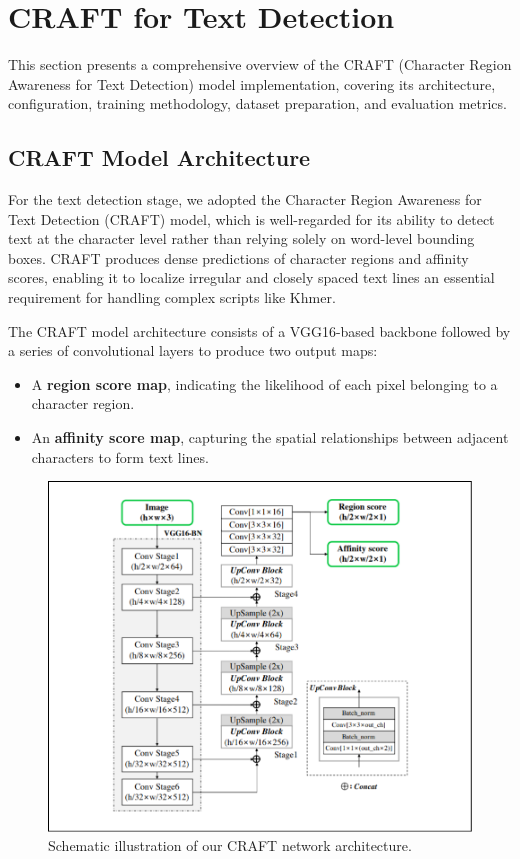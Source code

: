 \section{CRAFT for Text Detection}
\label{sec:craft-complete}

This section presents a comprehensive overview of the CRAFT (Character Region Awareness for Text Detection) model implementation, covering its architecture, configuration, training methodology, dataset preparation, and evaluation metrics.

\subsection{CRAFT Model Architecture}
\label{subsec:craft-architecture}

For the text detection stage, we adopted the Character Region Awareness for Text 
Detection (CRAFT) model, which is well-regarded for its ability to detect text at 
the character level rather than relying solely on word-level bounding boxes. 
CRAFT produces dense predictions of character regions and affinity scores, 
enabling it to localize irregular and closely spaced text lines an essential 
requirement for handling complex scripts like Khmer.

The CRAFT model architecture consists of a VGG16-based backbone followed by a series 
of convolutional layers to produce two output maps:
\begin{itemize}
\item A \textbf{region score map}, indicating the likelihood of each pixel belonging 
to a character region.
\item An \textbf{affinity score map}, capturing the spatial relationships between 
adjacent characters to form text lines.
\end{itemize}

\begin{figure}[H]
    \centering
    \includegraphics[width=\textwidth]{figures/craft_model.png}
    \caption{Schematic illustration of our CRAFT network architecture.
    \citep{baek2019craft}}
    \label{fig:craft-model}
\end{figure}

